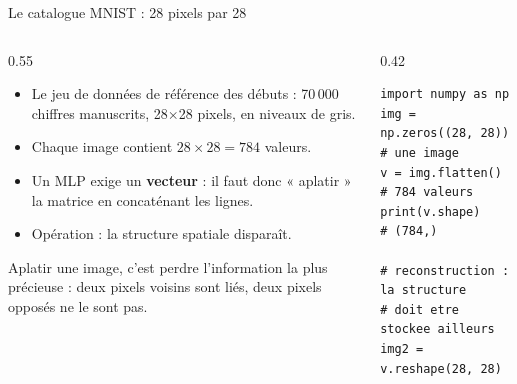 \begin{frame}[fragile]{Le catalogue MNIST : 28 pixels par 28}
\begin{columns}[t]
\begin{column}{0.55\textwidth}
\begin{itemize}
  \item Le jeu de données de référence des débuts : 70\,000 chiffres manuscrits,
  28$\times$28 pixels, en niveaux de gris.
  \item Chaque image contient $28 \times 28 = 784$ valeurs.
  \item Un MLP exige un \textbf{vecteur} : il faut donc « aplatir » la matrice
  en concaténant les lignes.
  \item Opération  : la structure spatiale disparaît.
\end{itemize}
\begin{wbox}
Aplatir une image, c'est perdre l'information la plus précieuse : deux pixels
voisins sont liés, deux pixels opposés ne le sont pas.
\end{wbox}
\end{column}
\begin{column}{0.42\textwidth}
\begin{codebox}
\begin{lstlisting}
import numpy as np
img = np.zeros((28, 28))    # une image
v = img.flatten()           # 784 valeurs
print(v.shape)              # (784,)

# reconstruction : la structure
# doit etre stockee ailleurs
img2 = v.reshape(28, 28)
\end{lstlisting}
\end{codebox}
\end{column}
\end{columns}
\end{frame}

